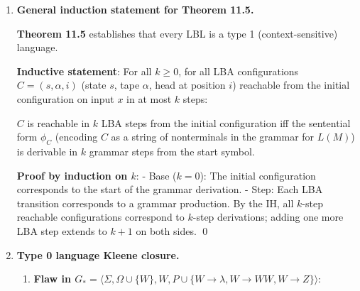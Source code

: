 \begin{enumerate}[{11.}1. ]
\textbf{Statement}: $\alpha s \beta \Dvdash \gamma t\omega$ in $M$ (Turing machine) iff $[\#^i\alpha s\beta\#^j] \DRightarrow [\#^m\gamma t\omega\#^n]$ (in the grammar constructed for Theorem 11.4), for some $i,j,m,n\in\NN$.

\textbf{Base} (0 transitions): $\alpha s\beta \Dvdash \alpha s\beta$, and $[\#^i\alpha s\beta\#^j]\DRightarrow[\#^i\alpha s\beta\#^j]$ (no derivation steps). \checkmark

\textbf{Step}: If $\alpha s\beta \vdash \gamma t\omega$ by one TM transition, the grammar applies the corresponding production (which is a context-sensitive rule encoding the TM transition). The $\#$ boundary markers are adjusted as needed (if the head moves to a new blank cell, a $\#$ is converted). By induction, chaining $k$ steps: $k$ TM transitions correspond to $k$ grammar derivation steps. \qed

\item \textbf{General induction statement for Theorem 11.5.}

\textbf{Theorem 11.5} establishes that every LBL is a type 1 (context-sensitive) language.

\textbf{Inductive statement}: For all $k \geq 0$, for all LBA configurations $C = (s, \alpha, i)$ (state $s$, tape $\alpha$, head at position $i$) reachable from the initial configuration on input $x$ in at most $k$ steps:

$C$ is reachable in $k$ LBA steps from the initial configuration iff the sentential form $\phi_C$ (encoding $C$ as a string of nonterminals in the grammar for $L(M)$) is derivable in $k$ grammar steps from the start symbol.

\textbf{Proof by induction on $k$}:
- Base ($k=0$): The initial configuration corresponds to the start of the grammar derivation. \checkmark
- Step: Each LBA transition corresponds to a grammar production. By the IH, all $k$-step reachable configurations correspond to $k$-step derivations; adding one more LBA step extends to $k+1$ on both sides. \qed

\item \textbf{Type 0 language Kleene closure.}

\begin{enumerate}
\item \textbf{Flaw in $G_* = \langle\Sigma,\Omega\cup\{W\},W,P\cup\{W\to\lambda,W\to WW,W\to Z\}\rangle$}:


\end{enumerate}
\end{enumerate}
